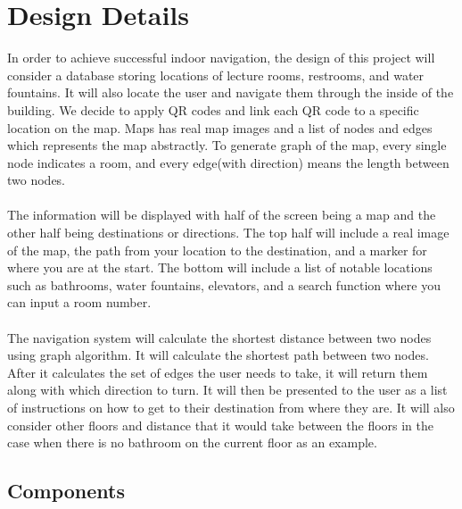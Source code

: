 \documentclass[12pt]{article}
\begin{document}
\section{Design Details}
In order to achieve successful indoor navigation, the design of this project will consider a database storing locations of lecture rooms, restrooms, and water fountains. It will also locate the user and navigate them through the inside of the building.  
We decide to apply QR codes and link each QR code to a specific location on the map. Maps has real map images and a list of nodes and edges which represents the map abstractly.  To generate graph of the map, every single node indicates a room, and every edge(with direction) means the length between two nodes. \\ \\
The information will be displayed with half of the screen being a map and the other half being destinations or directions. The top half will include a real image of the map, the path from your location to the destination, and a marker for where you are at the start. The bottom will include a list of notable locations such as bathrooms, water fountains, elevators, and a search function where you can input a room number. \\ \\
The navigation system will calculate the shortest distance between two nodes using graph algorithm. It will calculate the shortest path between two nodes. After it calculates the set of edges the user needs to take, it will return them along with which direction to turn. It will then be presented to the user as a list of instructions on how to get to their destination from where they are. It will also consider other floors and distance that it would take between the floors in the case when there is no bathroom on the current floor as an example.


\subsection{Components}
\end{document}
